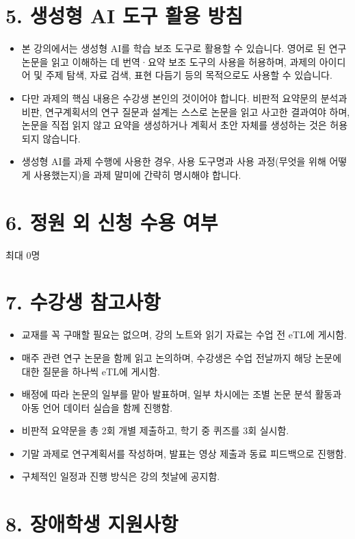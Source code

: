\documentclass{article}
\begin{document}
\newpage
\section{5. 생성형 AI 도구 활용 방침}
\medskip
\begin{itemize}
    \item 본 강의에서는 생성형 AI를 학습 보조 도구로 활용할 수 있습니다. 영어로 된 연구 논문을 읽고 이해하는 데 번역·요약 보조 도구의 사용을 허용하며, 과제의 아이디어 및 주제 탐색, 자료 검색, 표현 다듬기 등의 목적으로도 사용할 수 있습니다.
    \item 다만 과제의 핵심 내용은 수강생 본인의 것이어야 합니다. 비판적 요약문의 분석과 비판, 연구계획서의 연구 질문과 설계는 스스로 논문을 읽고 사고한 결과여야 하며, 논문을 직접 읽지 않고 요약을 생성하거나 계획서 초안 자체를 생성하는 것은 허용되지 않습니다.
    \item 생성형 AI를 과제 수행에 사용한 경우, 사용 도구명과 사용 과정(무엇을 위해 어떻게 사용했는지)을 과제 말미에 간략히 명시해야 합니다.
\end{itemize}

\section{6. 정원 외 신청 수용 여부}
\medskip
최대 0명

\section{7. 수강생 참고사항}
\begin{itemize}
    \item 교재를 꼭 구매할 필요는 없으며, 강의 노트와 읽기 자료는 수업 전 eTL에 게시함.
    \item 매주 관련 연구 논문을 함께 읽고 논의하며, 수강생은 수업 전날까지 해당 논문에 대한 질문을 하나씩 eTL에 게시함.
    \item 배정에 따라 논문의 일부를 맡아 발표하며, 일부 차시에는 조별 논문 분석 활동과 아동 언어 데이터 실습을 함께 진행함.
    \item 비판적 요약문을 총 2회 개별 제출하고, 학기 중 퀴즈를 3회 실시함.
    \item 기말 과제로 연구계획서를 작성하며, 발표는 영상 제출과 동료 피드백으로 진행함.
    \item 구체적인 일정과 진행 방식은 강의 첫날에 공지함.
\end{itemize}

\newpage
\section{8. 장애학생 지원사항}
\medskip
\end{document}
